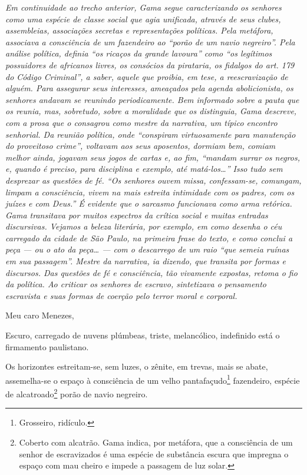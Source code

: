 \begin{resumo}
\emph{Em continuidade ao trecho anterior, Gama segue caracterizando os
senhores como uma espécie de classe social que agia unificada, através
de seus clubes, assembleias, associações secretas e representações
políticas. Pela metáfora, associava a consciência de um fazendeiro ao
``porão de um navio negreiro''. Pela análise política, definia ``os ricaços
da grande lavoura'' como ``os legítimos possuidores de africanos livres,
os consócios da pirataria, os fidalgos do art. 179 do Código Criminal'',
a saber, aquele que proibia, em tese, a reescravização de alguém. Para
assegurar seus interesses, ameaçados pela agenda abolicionista, os
senhores andavam se reunindo periodicamente. Bem informado sobre a pauta
que os reunia, mas, sobretudo, sobre a moralidade que os distinguia,
Gama descreve, com a prosa que o consagrou como mestre da narrativa, um
típico encontro senhorial. Da reunião política, onde ``conspiram
virtuosamente para manutenção do proveitoso crime'', voltavam aos seus
aposentos, dormiam bem, comiam melhor ainda, jogavam seus jogos de
cartas e, ao fim, ``mandam surrar os negros, e, quando é preciso, para
disciplina e exemplo, até matá-los\ldots{}'' Isso tudo sem desprezar as
questões de fé. ``Os senhores ouvem missa, confessam-se, comungam, limpam
a consciência, vivem na mais estreita intimidade com os padres, com os
juízes e com Deus.'' É evidente que o sarcasmo funcionava como arma
retórica. Gama transitava por muitos espectros da crítica social e
muitas entradas discursivas. Vejamos a beleza literária, por exemplo, em
como desenha o céu carregado da cidade de São Paulo, na primeira frase
do texto, e como conclui a peça --- ou o ato da peça\ldots{} --- com o
descarrego de um raio ``que semeia ruínas em sua passagem''. Mestre da
narrativa, ia dizendo, que transita por formas e discursos. Das questões
de fé e consciência, tão vivamente expostas, retoma o fio da política.
Ao criticar os senhores de escravo, sintetizava o pensamento
escravista e suas formas de coerção pelo terror moral e corporal. }
\end{resumo}\pagebreak

Meu caro Menezes,

Escuro, carregado de nuvens plúmbeas, triste, melancólico, indefinido
está o firmamento paulistano.

Os horizontes estreitam-se, sem luzes, o zênite, em trevas, mais se
abate, assemelha-se o espaço à consciência de um velho
pantafaçudo\footnote{Grosseiro, ridículo.} fazendeiro, espécie de
alcatroado\footnote{Coberto com alcatrão. Gama indica, por metáfora,
  que a consciência de um senhor de escravizados é uma espécie de
  substância escura que impregna o espaço com mau cheiro e impede a
  passagem de luz solar.} porão de navio negreiro.

